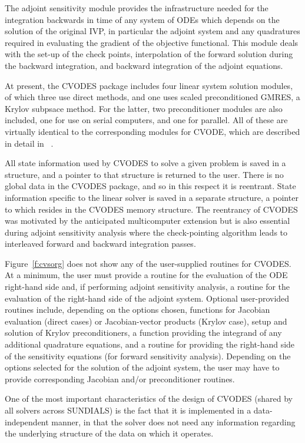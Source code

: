 The adjoint sensitivity module provides the infrastructure needed for
the integration backwards in time of any system of ODEs which depends
on the solution of the original IVP, in particular the adjoint system
and any quadratures required in evaluating the gradient of the
objective functional.  This module deals with the set-up of the check
points, interpolation of the forward solution during the backward
integration, and backward integration of the adjoint equations.

At present, the CVODES package includes four linear system solution
modules, of which three use direct methods, and one uses scaled
preconditioned GMRES, a Krylov subpsace method.  For the latter, two
preconditioner modules are also included, one for use on serial
computers, and one for parallel.  All of these are virtually identical
to the corresponding modules for CVODE, which are described in detail
in ~\cite{HBGLSSW:04}.

All state information used by CVODES to solve a given problem is saved
in a structure, and a pointer to that structure is returned to the
user.  There is no global data in the CVODES package, and so in this
respect it is reentrant. State information specific to the linear
solver is saved in a separate structure, a pointer to which resides in
the CVODES memory structure. The reentrancy of CVODES was motivated
by the anticipated multicomputer extension but is also essential
during adjoint sensitivity analysis where the check-pointing algorithm
leads to interleaved forward and backward integration passes. 

Figure~\ref{f:cvsorg} does not show any of the user-supplied routines
for CVODES. At a minimum, the user must provide a routine for the
evaluation of the ODE right-hand side and, if performing adjoint
sensitivity analysis, a routine for the evaluation of the right-hand
side of the adjoint system.  Optional user-provided routines include,
depending on the options chosen, functions for Jacobian evaluation
(direct cases) or Jacobian-vector products (Krylov case), setup and
solution of Krylov preconditioners, a function providing the integrand
of any additional quadrature equations, and a routine for providing
the right-hand side of the sensitivity equations (for forward
sensitivity analysis). Depending on the options selected for the
solution of the adjoint system, the user may have to provide
corresponding Jacobian and/or preconditioner routines.

One of the most important characteristics of the design of CVODES 
(shared by all solvers across SUNDIALS) is the fact that it is implemented 
in a data-independent manner, in that the solver does not need any information
regarding the underlying structure of the data on which it operates.

